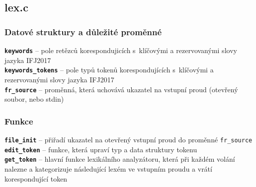 \documentclass[11pt,a4paper]{article}
\begin{document}
\subsection{lex.c}
\subsubsection*{Datové struktury a důležité proměnné}

\cprotect\textbf{\verb|keywords|} -- pole retězců korespondujicích s~klíčovými a rezervovanými slovy jazyka IFJ2017 \\

\noindent
\cprotect\textbf{\verb|keywords_tokens|} -- pole typů tokenů korespondujících s~klíčovými a rezervovanými slovy jazyka IFJ2017 \\

\noindent
\cprotect\textbf{\verb|fr_source|} -- proměnná, která uchovává ukazatel na vstupní proud (otevřený soubor, nebo stdin)

\subsubsection*{Funkce}
\cprotect\textbf{\verb|file_init|} -- přiřadí ukazatel na otevřený vstupní proud do proměnné \verb|fr_source| \\ 

\noindent
\cprotect\textbf{\verb|edit_token|} -- funkce, která upraví typ a data struktury tokenu \\ 

\noindent
\cprotect\textbf{\verb|get_token|} -- hlavní funkce lexikálního analyzátoru, která při každém volání nalezne a kategorizuje následující lexém ve vstupním proudu a vrátí korespondující token
\end{document}

